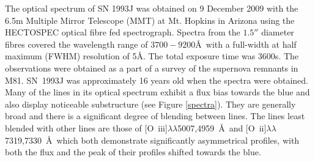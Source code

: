 The optical spectrum of SN 1993J was obtained on 9 December 2009 with the 6.5m Multiple Mirror Telescope (MMT) at Mt. Hopkins in Arizona using the HECTOSPEC optical fibre fed spectrograph. Spectra from the $1.5''$ diameter fibres covered the wavelength range of $3700-9200$\AA\  with a full-width at half maximum (FWHM) resolution of 5\AA.  The total exposure time was 3600s. The observations were obtained as a part of a survey of the supernova remnants in M81.  SN~1993J was approximately 16 years old when the spectra were obtained.  Many of the lines in its optical spectrum exhibit a flux bias towards the blue and also display noticeable substructure (see Figure \ref{spectra}).  They are generally broad and  there is a significant degree of blending between lines.  The lines least blended with other lines are those of [O~{\sc iii}]$\lambda\lambda$5007,4959~\AA\ and [O~{\sc ii}]$\lambda\lambda$7319,7330~\AA\ which both demonstrate significantly asymmetrical profiles, with both the flux and the peak of their profiles shifted towards the blue.
